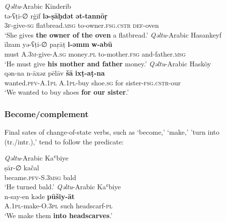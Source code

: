 \documentclass[output=paper,colorlinks,citecolor=brown,draftmode]{langscibook}
\begin{document}
\ea
\ea\label{Arabic:ex:21a}
\textit{Qəltu}-Arabic Kinderib \citep[6.1:§24]{Jastrow2003AKinderib} \\
\gll tə-ʕṭi-∅ rġīf \textbf{lə-ṣāḥdət} \textbf{ət-tannōṛ} \\
     \textsc{3f-}give\textsc{-sg} flatbread\textsc{.msg} to-owner\textsc{.fsg.cstr} \textsc{def-}oven \\
\glt `She gives \textbf{the owner of the oven} a flatbread.' 
\ex\label{Arabic:ex:21b}
\textit{Qəltu}-Arabic Hasankeyf \citep[6.4.2:§5]{Fink2020AHasankeyf} \\
\gll īlzam yə-ʕṭi-∅ paṛāṭ \textbf{l-əmm} \textbf{w-abū} \\
     must \textsc{A.3m-}give\textsc{-A.sg} money\textsc{.pl} to-mother\textsc{.fsg} and-father\textsc{.msg} \\
\glt `He must give \textbf{his mother and father} money.' 
\ex\label{Arabic:ex:21c}
\textit{Qəltu}-Arabic Hasköy \citep[I.2.2.:§9]{Talay2002AHaskoyT} \\
\gll qən-na n-āxəz pēlāv \textbf{šā} \textbf{ixṭ-aṭ-na} \\
     wanted\textsc{.pfv-A.1pl} \textsc{A.1pl-}buy shoe\textsc{.sg} for sister\textsc{-fsg.cstr-}our \\
\glt `We wanted to buy shoes \textbf{for our sister}.'
\z
\z

\subsubsection{Become/complement}\label{Arabic:2.2.3}

Final sates of change-of-state verbs, such as `become,' `make,' 'turn into (tr./intr.),' tend to follow the predicate:

\ea
\ea\label{Arabic:ex:22a}
\textit{Qəltu}-Arabic Kaʿbiye \citep[XIII:§2]{Jastrow2022CADiyarbakir} \\
\gll ṣār-∅ kačal \\
     became\textsc{.pfv-S.3msg} bald \\
\glt `He turned bald.'
\ex\label{Arabic:ex:22b}
\textit{Qəltu}-Arabic Kaʿbiye \citep[IX:§11]{Jastrow2022CADiyarbakir} \\
\gll n-say-en kəde \textbf{pūšiy-āt} \\
     \textsc{A.1pl-}make\textsc{-O.3pl} such headscarf\textsc{-pl} \\
\glt `We make them \textbf{into headscarves}.' 
\z
\z
\end{document}
